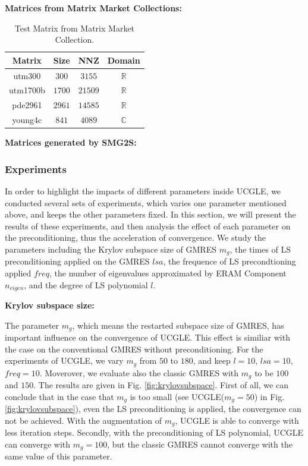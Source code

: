 \textbf{Matrices from Matrix Market Collections: }
\begin{table}[htbp]
	\renewcommand{\arraystretch}{1.4}
	\small	
	\caption{Test Matrix from Matrix Market Collection.}
	\label{testmatrixforparameters}
	\centering
	\begin{tabular}{c|c|c|c}
		\toprule
			\cellcolor{gray!50}Matrix  & 	\cellcolor{gray!50}Size & 	\cellcolor{gray!50}NNZ & 	\cellcolor{gray!50}Domain\\
		\midrule
		utm300  & $300$ & $3155$ &$\mathbb{R}$ \\
			\cellcolor{gray!20}utm1700b & 	\cellcolor{gray!20}$1700$ & 	\cellcolor{gray!20}$21509$  & 	\cellcolor{gray!20}$\mathbb{R}$ \\
		pde2961 & $2961$ & $14585$& $\mathbb{R}$ \\
			\cellcolor{gray!20}young4c & 	\cellcolor{gray!20}$841$ & 	\cellcolor{gray!20}$4089$& 	\cellcolor{gray!20}$\mathbb{C}$ \\
		\bottomrule
	\end{tabular}
\end{table}

\textbf{Matrices generated by SMG2S: }

\subsubsection{Experiments}

In order to highlight the impacts of different parameters inside UCGLE, we conducted several sets of experiments, which varies one parameter mentioned above, and keeps the other parameters fixed. In this section, we will present the results of these experiments, and then analysis the effect of each parameter on the preconditioning, thus the acceleration of convergence. We study the parameters including the Krylov subspace size of GMRES $m_g$, the times of LS preconditioning applied on the GMRES $lsa$, the frequence of LS precondtioning applied $freq$, the number of eigenvalues approximated by ERAM Component $n_{eigen}$, and the degree of LS polynomial $l$.

\textbf{Krylov subspace size: }

The parameter $m_g$, which means the restarted subspace size of GMRES, has important influence on the convergence of UCGLE.  This effect is similiar with the case on the conventional GMRES without preconditioning. For the experiments of UCGLE, we vary $m_g$ from $50$ to $180$, and keep $l=10$, $lsa=10$, $freq=10$. Moverover, we evaluate also the classic GMRES with $m_g$ to be $100$ and $150$. The results are given in Fig. \ref{fig:krylovsubspace}. First of all, we can conclude that in the case that $m_g$ is too small (see UCGLE($m_g=50$) in  Fig. \ref{fig:krylovsubspace}), even the LS preconditioning is applied, the convergence can not be achieved. With the augmentation of $m_g$, UCGLE is able to converge with less iteration steps. Secondly, with the preconditioning of LS polynomial, UCGLE can converge with $m_g=100$, but the classic GMRES cannot converge with the same value of this parameter.

